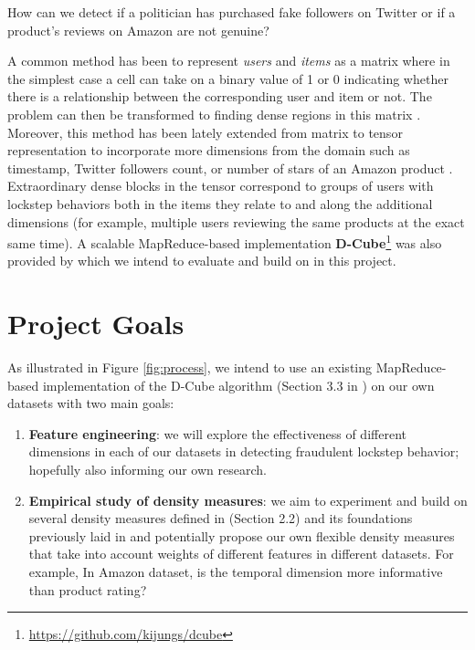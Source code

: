 \documentclass[10pt,twocolumn]{article}
\begin{document}
How can we detect if a politician has purchased fake followers on Twitter or if a product's reviews on Amazon are not genuine?

A common method has been to represent \emph{users} and \emph{items} as a matrix where in the simplest case a cell can take on a binary value of 1 or 0 indicating whether there is a relationship between the corresponding user and item or not. The problem can then be transformed to finding dense regions in this matrix \cite{hooi2016fraudar}. Moreover, this method has been lately extended from matrix to tensor representation to incorporate more dimensions from the domain such as timestamp, Twitter followers count, or number of stars of an Amazon product \cite{shin2016m} \cite{shin2017d}. Extraordinary dense blocks in the tensor correspond to groups of users with lockstep behaviors both in the items they relate to and along the additional dimensions (for example, multiple users reviewing the same products at the exact same time). A scalable MapReduce-based implementation \textbf{D-Cube}\footnote{\href{https://github.com/kijungs/dcube}{https://github.com/kijungs/dcube}} was also provided by \cite{shin2017d} which we intend to evaluate and build on in this project.



\section{Project Goals}

As illustrated in Figure \ref{fig:process}, we intend to use an existing MapReduce-based implementation of the D-Cube algorithm (Section 3.3 in \cite{shin2017d}) on our own datasets with two main goals:
\begin{enumerate}
	\item \textbf{Feature engineering}: we will explore the effectiveness of different dimensions in each of our datasets in detecting fraudulent lockstep behavior; hopefully also informing our own research.
	\item \textbf{Empirical study of density measures}: we aim to experiment and build on several density measures defined in \cite{shin2017d} (Section 2.2) and its foundations previously laid in \cite{jiang2015general} and potentially propose our own flexible density measures that take into account weights of different features in different datasets. For example, In Amazon dataset, is the temporal dimension more informative than product rating?
\end{enumerate}
\end{document}
